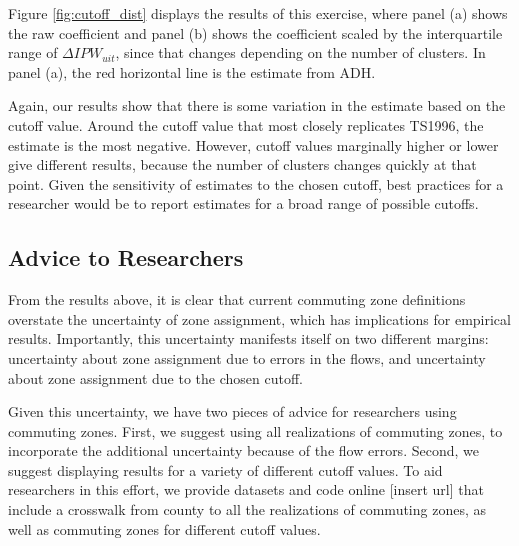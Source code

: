 Figure \ref{fig:cutoff_dist} displays the results of this exercise, where panel (a) shows the raw coefficient and panel (b) shows the coefficient scaled by the interquartile range of $\Delta IPW_{uit}$, since that changes depending on the number of clusters. In panel (a),  the red horizontal line is the estimate from ADH.

Again, our results show that there is some variation in the estimate based on the cutoff value. Around the cutoff value that most closely replicates TS1996, the estimate is the most negative. However, cutoff values marginally higher or lower give different results, because the number of clusters changes quickly at that point. Given the sensitivity of estimates to the chosen cutoff, best practices for a researcher would be to report estimates for a broad range of possible cutoffs.	

\subsection{Advice to Researchers}

From the results above, it is clear that current commuting zone definitions overstate the uncertainty of zone assignment, which has implications for empirical results. Importantly, this uncertainty manifests itself on two different margins: uncertainty about zone assignment due to errors in the flows, and uncertainty about zone assignment due to the chosen cutoff. 

Given this uncertainty, we have two pieces of advice for researchers using commuting zones. First, we suggest using all realizations of commuting zones, to incorporate the additional uncertainty because of the flow errors. Second, we suggest displaying results for a variety of different cutoff values. To aid researchers in this effort, we provide datasets and code online [insert url] that include a crosswalk from county to all the realizations of commuting zones, as well as commuting zones for different cutoff values.



